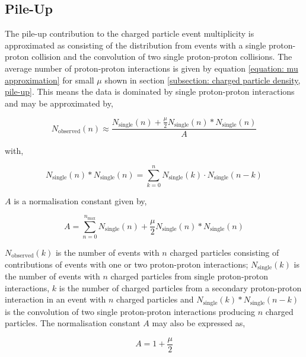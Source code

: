 \subsection{Pile-Up}
\label{subsection: charged particle event multiplicity, pile-up}

The pile-up contribution to the charged particle event multiplicity is approximated as consisting of the distribution from events with a single proton-proton collision and the convolution of two single proton-proton collisions. The average number of proton-proton interactions is given by equation \ref{equation: mu approximation} for small $\mu$ shown in section \ref{subsection: charged particle density, pile-up}. This means the data is dominated by single proton-proton interactions and may be approximated by,

\begin{equation}
	N_\mathrm{observed}(n) \approx \frac{N_\mathrm{single}(n) + \frac{\mu}{2} N_\mathrm{single}(n) \ast N_\mathrm{single}(n)}{A}
	\label{equation: pile-up multiplicity composition}
\end{equation}

with,

\begin{equation}
	N_\mathrm{single}(n) \ast N_\mathrm{single}(n) = \sum_{k=0}^{n} N_\mathrm{single}(k) \cdot N_\mathrm{single} (n - k)
\end{equation}

$A$ is a normalisation constant given by,

\begin{equation}
	A = \sum_{n=0}^{n_\mathrm{max}} N_\mathrm{single}(n) + \frac{\mu}{2} N_\mathrm{single}(n) \ast N_\mathrm{single}(n)
\end{equation}

 $N_\mathrm{observed}(k)$ is the number of events with $n$ charged particles consisting of contributions of events with one or two proton-proton interactions; $N_\mathrm{single}(k)$ is the number of events with $n$ charged particles from single proton-proton interactions, $k$ is the number of charged particles from a secondary proton-proton interaction in an event with $n$ charged particles and $N_\mathrm{single}(k) \ast N_\mathrm{single} (n - k)$ is the convolution of two single proton-proton interactions producing $n$ charged particles. The normalisation constant $A$ may also be expressed as,

\begin{equation}
	A = 1 + \frac{\mu}{2}
\end{equation}

